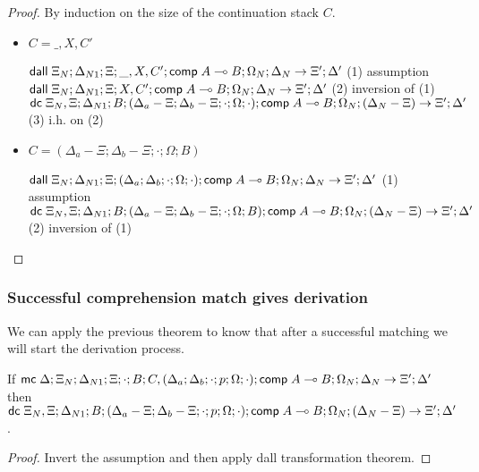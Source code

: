 \begin{proof}
   By induction on the size of the continuation stack $C$.
   
   \begin{itemize}
      \item $C = \_, X, C'$
      
      $\mathsf{dall} \; \Xi_N; \Delta_{N1}; \Xi; \_, X, C'; \mathsf{comp} \; A \multimap B; \Omega_N; \Delta_N \rightarrow \Xi'; \Delta'$ \hfill (1) assumption \\
      $\mathsf{dall} \; \Xi_N; \Delta_{N1}; \Xi; X, C'; \mathsf{comp} \; A \multimap B; \Omega_N; \Delta_N \rightarrow \Xi'; \Delta'$ \hfill (2) inversion of (1) \\
      $\mathsf{dc} \; \Xi_N, \Xi; \Delta_{N1}; B; (\Delta_a - \Xi; \Delta_b - \Xi; \cdot; \Omega; \cdot); \mathsf{comp} \; A \multimap B; \Omega_N; (\Delta_N - \Xi) \rightarrow \Xi'; \Delta'$ \hfill (3) i.h. on (2) \\
      
      \item $C = (\Delta_a - \Xi; \Delta_b - \Xi; \cdot; \Omega; B)$
      
      $\mathsf{dall} \; \Xi_N; \Delta_{N1}; \Xi; (\Delta_a; \Delta_b; \cdot; \Omega; \cdot); \mathsf{comp} \; A \multimap B; \Omega_N; \Delta_N \rightarrow \Xi'; \Delta'$ \hfill (1) assumption \\
      $\mathsf{dc} \; \Xi_N, \Xi; \Delta_{N1}; B; (\Delta_a - \Xi; \Delta_b - \Xi; \cdot; \Omega; B); \mathsf{comp} \; A \multimap B; \Omega_N; (\Delta_N - \Xi) \rightarrow \Xi'; \Delta'$ \hfill (2) inversion of (1) \\
   \end{itemize}
\end{proof}

\subsubsection{Successful comprehension match gives derivation}

We can apply the previous theorem to know that after a successful matching we will start the derivation process.

If $\mathsf{mc} \; \Delta; \Xi_N; \Delta_{N1}; \Xi; \cdot; B; C, (\Delta_a; \Delta_b; \cdot; p; \Omega; \cdot); \mathsf{comp} \; A \multimap B; \Omega_N; \Delta_N \rightarrow \Xi'; \Delta'$ then
$\mathsf{dc} \; \Xi_N, \Xi; \Delta_{N1}; B; (\Delta_a - \Xi; \Delta_b - \Xi; \cdot; p; \Omega; \cdot); \mathsf{comp} \; A \multimap B; \Omega_N; (\Delta_N - \Xi) \rightarrow \Xi'; \Delta'$.

\begin{proof}
   Invert the assumption and then apply dall transformation theorem.
\end{proof}

